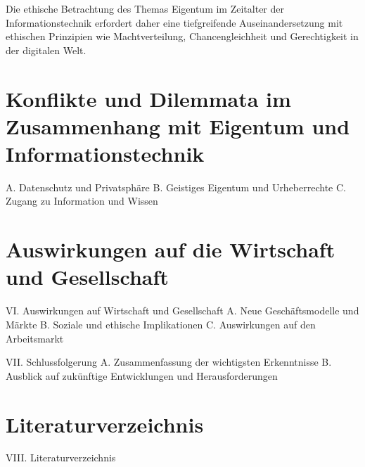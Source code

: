 \documentclass[journal]{IEEEtran}
\begin{document}
\begin{onecolumn}
Die ethische Betrachtung des Themas Eigentum im Zeitalter der Informationstechnik 
erfordert daher eine tiefgreifende Auseinandersetzung mit ethischen Prinzipien wie 
Machtverteilung, Chancengleichheit und Gerechtigkeit in der digitalen Welt.


\section*{Konflikte und Dilemmata im Zusammenhang mit Eigentum und Informationstechnik}
A. Datenschutz und Privatsphäre
B. Geistiges Eigentum und Urheberrechte
C. Zugang zu Information und Wissen

\section*{Auswirkungen auf die Wirtschaft und Gesellschaft}
VI. Auswirkungen auf Wirtschaft und Gesellschaft
A. Neue Geschäftsmodelle und Märkte
B. Soziale und ethische Implikationen
C. Auswirkungen auf den Arbeitsmarkt

VII. Schlussfolgerung
A. Zusammenfassung der wichtigsten Erkenntnisse
B. Ausblick auf zukünftige Entwicklungen und Herausforderungen

\section*{Literaturverzeichnis}
VIII. Literaturverzeichnis


\end{onecolumn}
\end{document}
